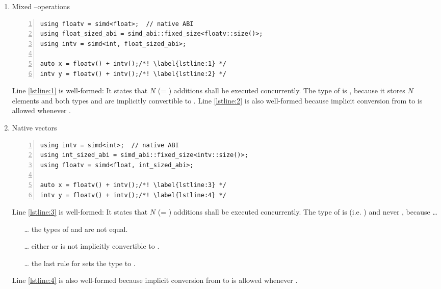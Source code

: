 \begin{enumerate}
  \item Mixed \intt--\float operations
\smallskip\begin{lstlisting}[style=Vc,numbers=left]
using floatv = simd<float>;  // native ABI
using float_sized_abi = simd_abi::fixed_size<floatv::size()>;
using intv = simd<int, float_sized_abi>;

auto x = floatv() + intv();/*! \label{lstline:1} */
intv y = floatv() + intv();/*! \label{lstline:2} */
\end{lstlisting}
    Line \ref{lstline:1} is well-formed:
    It states that $N$ (= ) additions shall be executed concurrently.
    The type of  is \simd[<\float{}>], because it stores $N$ elements and both types  and  are implicitly convertible to \simd[<\float{}>].
    Line \ref{lstline:2} is also well-formed because implicit conversion from  to  is allowed whenever .

  \item Native \intt vectors
\smallskip\begin{lstlisting}[style=Vc,numbers=left]
using intv = simd<int>;  // native ABI
using int_sized_abi = simd_abi::fixed_size<intv::size()>;
using floatv = simd<float, int_sized_abi>;

auto x = floatv() + intv();/*! \label{lstline:3} */
intv y = floatv() + intv();/*! \label{lstline:4} */
\end{lstlisting}
    Line \ref{lstline:3} is well-formed:
    It states that $N$ (= ) additions shall be executed concurrently.
    The type of  is  (i.e. ) and never \simd[<\float{}>], because \ldots
    \begin{enumerate}
      \item[\ldots] the  types of  and  are not equal.
      \item[\ldots] either  or  is not implicitly convertible to \simd[<\float{}>].
      \item[\ldots] the last rule for  sets the  type to .
    \end{enumerate}
    Line \ref{lstline:4} is also well-formed because implicit conversion from  to  is allowed whenever .
\end{enumerate}


